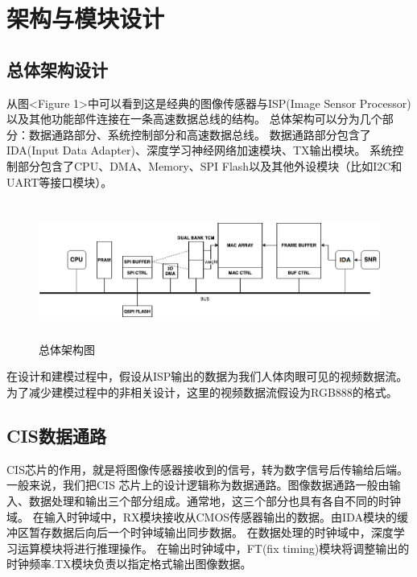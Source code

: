 
\chapter{架构与模块设计}

\section{总体架构设计}

从图<Figure 1>中可以看到这是经典的图像传感器与ISP(Image Sensor Processor)以及其他功能部件连接在一条高速数据总线的结构。
总体架构可以分为几个部分：数据通路部分、系统控制部分和高速数据总线。
数据通路部分包含了IDA(Input Data Adapter)、深度学习神经网络加速模块、TX输出模块。
系统控制部分包含了CPU、DMA、Memory、SPI Flash以及其他外设模块（比如I2C和UART等接口模块）。
\begin{figure}[htbp]
    \centering
    \includegraphics[width=15cm,height=4.5cm]{figures/bnn.png}
    \caption{总体架构图}
    \label{1}
\end{figure}
在设计和建模过程中，假设从ISP输出的数据为我们人体肉眼可见的视频数据流。
为了减少建模过程中的非相关设计，这里的视频数据流假设为RGB888的格式。

\section{CIS数据通路}
CIS芯片的作用，就是将图像传感器接收到的信号，转为数字信号后传输给后端。一般来说，我们把CIS
芯片上的设计逻辑称为数据通路。图像数据通路一般由输入、数据处理和输出三个部分组成。通常地，这三个部分也具有各自不同的时钟域。
在输入时钟域中，RX模块接收从CMOS传感器输出的数据。由IDA模块的缓冲区暂存数据后向后一个时钟域输出同步数据。
在数据处理的时钟域中，深度学习运算模块将进行推理操作。
在输出时钟域中，FT(fix timing)模块将调整输出的时钟频率.TX模块负责以指定格式输出图像数据。  

